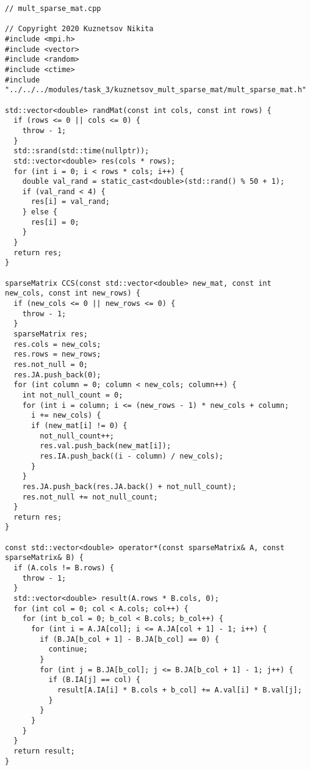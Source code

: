 \documentclass{report}
\begin{document}
\begin{lstlisting}
// mult_sparse_mat.cpp

// Copyright 2020 Kuznetsov Nikita
#include <mpi.h>
#include <vector>
#include <random>
#include <ctime>
#include "../../../modules/task_3/kuznetsov_mult_sparse_mat/mult_sparse_mat.h"

std::vector<double> randMat(const int cols, const int rows) {
  if (rows <= 0 || cols <= 0) {
    throw - 1;
  }
  std::srand(std::time(nullptr));
  std::vector<double> res(cols * rows);
  for (int i = 0; i < rows * cols; i++) {
    double val_rand = static_cast<double>(std::rand() % 50 + 1);
    if (val_rand < 4) {
      res[i] = val_rand;
    } else {
      res[i] = 0;
    }
  }
  return res;
}

sparseMatrix CCS(const std::vector<double> new_mat, const int new_cols, const int new_rows) {
  if (new_cols <= 0 || new_rows <= 0) {
    throw - 1;
  }
  sparseMatrix res;
  res.cols = new_cols;
  res.rows = new_rows;
  res.not_null = 0;
  res.JA.push_back(0);
  for (int column = 0; column < new_cols; column++) {
    int not_null_count = 0;
    for (int i = column; i <= (new_rows - 1) * new_cols + column;
      i += new_cols) {
      if (new_mat[i] != 0) {
        not_null_count++;
        res.val.push_back(new_mat[i]);
        res.IA.push_back((i - column) / new_cols);
      }
    }
    res.JA.push_back(res.JA.back() + not_null_count);
    res.not_null += not_null_count;
  }
  return res;
}

const std::vector<double> operator*(const sparseMatrix& A, const sparseMatrix& B) {
  if (A.cols != B.rows) {
    throw - 1;
  }
  std::vector<double> result(A.rows * B.cols, 0);
  for (int col = 0; col < A.cols; col++) {
    for (int b_col = 0; b_col < B.cols; b_col++) {
      for (int i = A.JA[col]; i <= A.JA[col + 1] - 1; i++) {
        if (B.JA[b_col + 1] - B.JA[b_col] == 0) {
          continue;
        }
        for (int j = B.JA[b_col]; j <= B.JA[b_col + 1] - 1; j++) {
          if (B.IA[j] == col) {
            result[A.IA[i] * B.cols + b_col] += A.val[i] * B.val[j];
          }
        }
      }
    }
  }
  return result;
}


\end{lstlisting}
\end{document}
